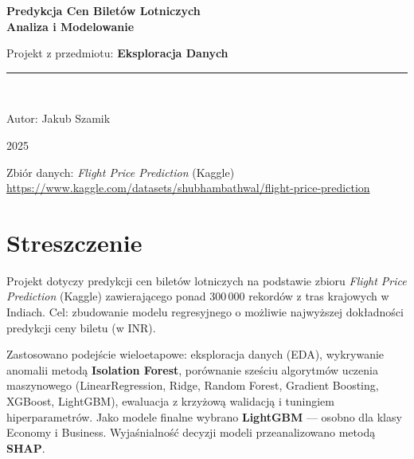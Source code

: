 \documentclass[12pt,a4paper]{article}
\begin{document}
	
	\begin{titlepage}
		\centering
		\vspace*{2cm}
		{\LARGE\bfseries Predykcja Cen Biletów Lotniczych\\[0.4em]
			Analiza i Modelowanie\par}
		\vspace{1.5cm}
		{\large Projekt z przedmiotu: \textbf{Eksploracja Danych}\par}
		\vspace{0.8cm}
		\rule{0.6\textwidth}{0.4pt}\\[0.8cm]
		{\normalsize Autor: Jakub Szamik\par}
		\vspace{0.4cm}
		{\normalsize 2025\par}
		\vfill
		{\small Zbiór danych: \textit{Flight Price Prediction} (Kaggle)\\
			\url{https://www.kaggle.com/datasets/shubhambathwal/flight-price-prediction}\par}
		\vspace{1cm}
	\end{titlepage}
	
	\thispagestyle{empty}
	\tableofcontents
	\newpage
	
	\section*{Streszczenie}
	
	Projekt dotyczy predykcji cen biletów lotniczych na podstawie zbioru
	\textit{Flight Price Prediction} (Kaggle) zawierającego ponad 300\,000 rekordów
	z tras krajowych w Indiach. Cel: zbudowanie modelu regresyjnego o możliwie
	najwyższej dokładności predykcji ceny biletu (w INR).
	
	Zastosowano podejście wieloetapowe: eksploracja danych (EDA), wykrywanie anomalii
	metodą \textbf{Isolation Forest}, porównanie sześciu algorytmów uczenia maszynowego
	(LinearRegression, Ridge, Random Forest, Gradient Boosting, XGBoost, LightGBM),
	ewaluacja z krzyżową walidacją i tuningiem hiperparametrów. Jako modele finalne
	wybrano \textbf{LightGBM} --- osobno dla klasy Economy i Business. Wyjaśnialność
	decyzji modeli przeanalizowano metodą \textbf{SHAP}.
	
	
\end{document}
